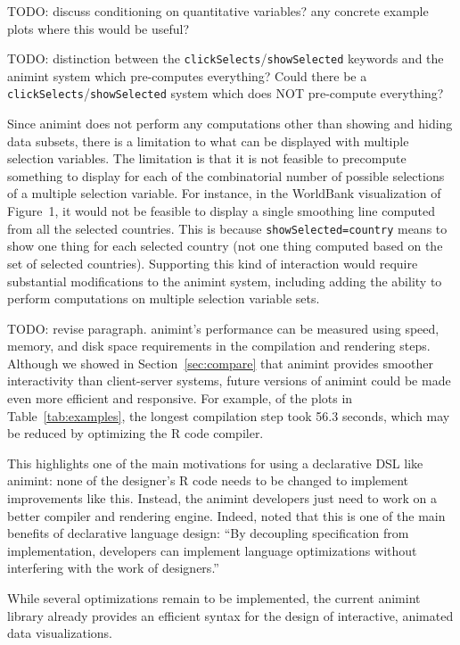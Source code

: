 \documentclass[journal]{vgtc}\usepackage[]{graphicx}\usepackage[]{color}
\begin{document}
TODO: discuss conditioning on quantitative variables? any concrete
example plots where this would be useful?

TODO: distinction between the \texttt{clickSelects}/\texttt{showSelected} keywords and
the animint system which pre-computes everything? Could there be a
\texttt{clickSelects}/\texttt{showSelected} system which does NOT pre-compute
everything?

Since animint does not perform any computations other than showing and
hiding data subsets, there is a limitation to what can be
displayed with multiple selection variables.
The limitation is that it is not feasible to precompute
something to display for each of the combinatorial number of
possible selections
of a multiple selection variable.
For instance, in the
WorldBank visualization of Figure~1, it would not be feasible to
display a single smoothing line computed from all the selected
countries. This is because \texttt{showSelected=country} means to show
one thing for each selected country (not one thing computed based on
the set of selected countries). Supporting this kind of interaction
would require substantial modifications to the animint system,
including adding the ability to perform computations on
multiple selection variable sets.

TODO: revise paragraph. animint's performance can be measured using
speed, memory, and disk space requirements in the compilation and
rendering steps. Although we showed in Section~\ref{sec:compare} that
animint provides smoother interactivity than client-server systems,
future versions of animint could be made even more efficient and
responsive. For example, of the plots in Table~\ref{tab:examples}, the
longest compilation step took 56.3 seconds, which may be reduced by
optimizing the R code compiler.

This highlights one of the main motivations for using a declarative
DSL like animint: none of the designer's R code needs to be changed to
implement improvements like this. Instead, the animint developers just
need to work on a better compiler and rendering engine. Indeed,
\citet{declarative} noted that this is one of the main benefits of
declarative language design: ``By decoupling specification from
implementation, developers can implement language optimizations
without interfering with the work of designers.''

While several
optimizations remain to be implemented, the current animint library
already provides an efficient syntax for the design of interactive,
animated data visualizations.
\end{document}
